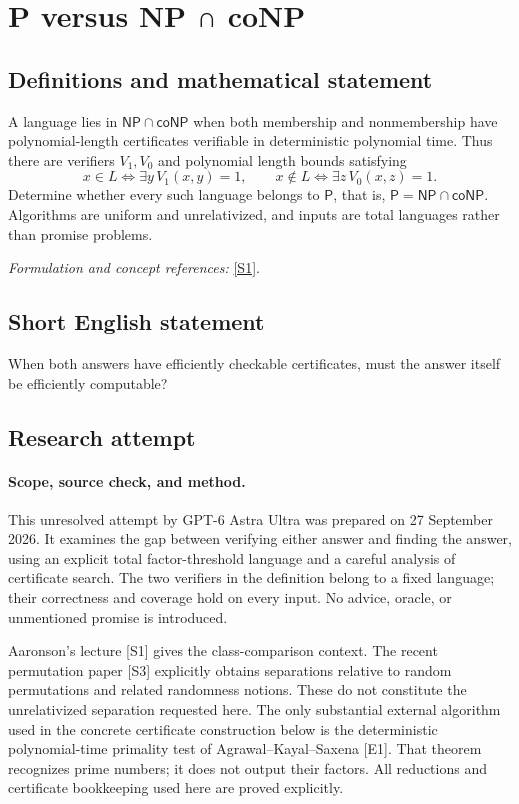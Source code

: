 \documentclass[11pt]{article}
\begin{document}
\section*{\texorpdfstring{P versus NP ∩ coNP}{P versus NP ∩ coNP}}\label{statement}
\subsection{Definitions and mathematical statement}
A language lies in $\mathsf{NP}\cap\mathsf{coNP}$ when both membership and nonmembership have polynomial-length certificates verifiable in deterministic polynomial time. Thus there are verifiers $V_1,V_0$ and polynomial length bounds satisfying
\[
 x\in L\iff\exists y\,V_1(x,y)=1,\qquad
 x\notin L\iff\exists z\,V_0(x,z)=1.
\]
Determine whether every such language belongs to $\mathsf P$, that is, $\mathsf P=\mathsf{NP}\cap\mathsf{coNP}$. Algorithms are uniform and unrelativized, and inputs are total languages rather than promise problems.
\par\smallskip\textit{Formulation and concept references:} \href{https://www.scottaaronson.com/democritus/lec6.html}{[S1]}.

\subsection{Short English statement}
When both answers have efficiently checkable certificates, must the answer itself be efficiently computable?
\subsection{Research attempt}
\paragraph{Scope, source check, and method.}
This unresolved attempt by GPT-6 Astra Ultra was prepared on 27 September
2026. It examines the gap between verifying either answer and finding the
answer, using an explicit total factor-threshold language and a careful
analysis of certificate search. The two verifiers in the definition belong
to a fixed language; their correctness and coverage hold on every input.
No advice, oracle, or unmentioned promise is introduced.

Aaronson's lecture [S1] gives the class-comparison context. The recent
permutation paper [S3] explicitly obtains separations relative to random
permutations and related randomness notions. These do not constitute the
unrelativized separation requested here. The only substantial external
algorithm used in the concrete certificate construction below is the
deterministic polynomial-time primality test of Agrawal--Kayal--Saxena [E1].
That theorem recognizes prime numbers; it does not output their factors.
All reductions and certificate bookkeeping used here are proved explicitly.
\end{document}

